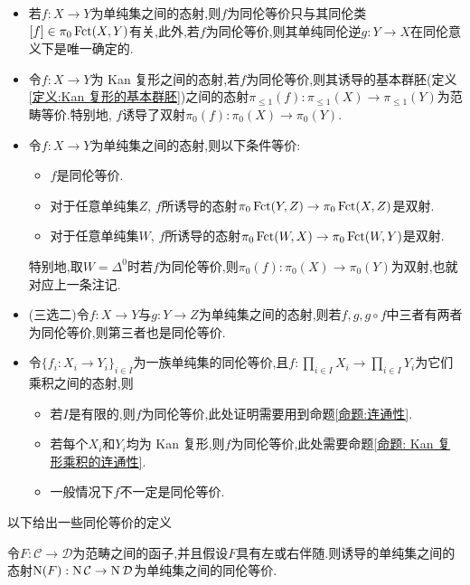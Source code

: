 \begin{remark}
    \begin{itemize}
        \item 若$f : X \to Y$为单纯集之间的态射,则$f$为同伦等价只与其同伦类$[f]\in \pi_0 \operatorname{Fct}(X,Y)$有关,此外,若$f$为同伦等价,则其单纯同伦逆$g : Y \to X$在同伦意义下是唯一确定的.
        \item 令$f : X \to Y$为 Kan 复形之间的态射,若$f$为同伦等价,则其诱导的基本群胚(定义\ref{定义:Kan 复形的基本群胚})之间的态射$\pi_{\leq 1}(f) : \pi_{\leq 1}(X) \to \pi_{\leq 1}(Y)$为范畴等价.特别地, $f$诱导了双射$\pi_0(f): \pi_0(X)\to \pi_0(Y)$.
        \item 令$f : X \to Y$为单纯集之间的态射,则以下条件等价:
        \begin{itemize}
            \item $f$是同伦等价.
            \item 对于任意单纯集$Z$, $f$所诱导的态射$\pi_0 \operatorname{Fct}(Y,Z) \to \pi_0 \operatorname{Fct}(X,Z)$是双射.
            \item 对于任意单纯集$W$, $f$所诱导的态射$\pi_0 \operatorname{Fct}(W,X) \to \pi_0 \operatorname{Fct}(W,Y)$是双射.
        \end{itemize}
        特别地,取$W = \Delta^0$时若$f$为同伦等价,则$\pi_0(f) : \pi_0 (X)\to \pi_0(Y)$为双射,也就对应上一条注记.
        \item (三选二)令$f : X \to Y$与$g : Y \to Z$为单纯集之间的态射,则若$f,g,g\circ f$中三者有两者为同伦等价,则第三者也是同伦等价.
        \item 令$\{f_i : X_i \to Y_i\}_{i\in I}$为一族单纯集的同伦等价,且$f: \prod_{i\in I}X_i \to \prod_{i\in I}Y_i$为它们乘积之间的态射,则
        \begin{itemize}
            \item 若$I$是有限的,则$f$为同伦等价,此处证明需要用到命题\ref{命题:连通性}.
            \item 若每个$X_i$和$Y_i$均为 Kan 复形,则$f$为同伦等价,此处需要命题\ref{命题: Kan 复形乘积的连通性}.
            \item 一般情况下$f$不一定是同伦等价.
        \end{itemize}
    \end{itemize}
\end{remark}
以下给出一些同伦等价的定义
\begin{proposition}
    令$F: \mathcal{C} \to \mathcal{D}$为范畴之间的函子,并且假设$F$具有左或右伴随.则诱导的单纯集之间的态射$\operatorname{N}(F) : \operatorname{N} \mathcal{C} \to \operatorname{N} \mathcal{D}$为单纯集之间的同伦等价.
\end{proposition}
